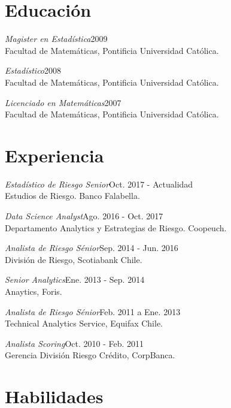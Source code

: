 \documentclass[margin]{res}
\begin{document}
\begin{resume}

\section{Educación}

    {\sl Magister en Estadística}\hfill 2009\\
    Facultad de Matemáticas, Pontificia Universidad Católica.

    {\sl Estadístico}\hfill 2008\\
    Facultad de Matemáticas, Pontificia Universidad Católica.

    {\sl Licenciado en Matemáticas}\hfill 2007\\
    Facultad de Matemáticas, Pontificia Universidad Católica.

\vspace{1cm}

\section{Experiencia}

    {\sl Estadístico de Riesgo Senior}\hfill Oct. 2017 - Actualidad\\
         Estudios de Riesgo. Banco Falabella.

    {\sl Data Science Analyst}\hfill Ago. 2016 - Oct. 2017\\
        Departamento Analytics y Estrategias de Riesgo. Coopeuch.

    {\sl Analista de Riesgo Sénior}\hfill Sep. 2014 - Jun. 2016\\
        División de Riesgo, Scotiabank Chile.

    {\sl Senior Analytics}\hfill Ene. 2013 - Sep. 2014\\
    Anaytics, Foris.

    {\sl Analista de Riesgo Sénior}\hfill Feb. 2011 a Ene. 2013\\
    Technical Analytics Service, Equifax Chile.

    {\sl Analista Scoring}\hfill Oct. 2010 - Feb. 2011\\
    Gerencia División Riesgo Crédito, CorpBanca.

\vspace{1cm}

\section{Habilidades}


\end{resume}
\end{document}
